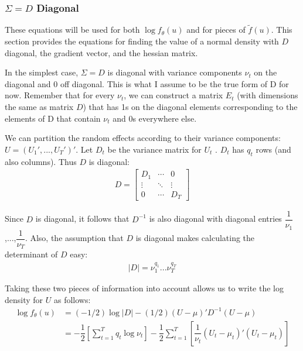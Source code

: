 \documentclass{article}
\begin{document}
\subsubsection{$\Sigma=D$ Diagonal}\label{sec:Ddiag}
These equations will be used for both $\log f_\theta(u)$ and for pieces of $\tilde{f}(u)$.  This section provides the equations for finding the value  of a normal density with $D$ diagonal, the gradient vector, and the hessian matrix.


In the simplest case, $\Sigma=D$ is diagonal with variance components $\nu_t$ on the diagonal and 0 off diagonal. This is what I assume to be the true form of D for now.  Remember that for every $\nu_t$, we can construct a matrix $E_t$ (with dimensions the same as matrix $D$) that has 1s on the diagonal elements corresponding to the elements of D that contain $\nu_t$ and 0s everywhere else.  

We can partition the random effects according to their variance components: $U=(U_1',...,U_T')'$.  Let $D_t$ be the variance matrix for $U_t$ . $D_t$ has $q_t$ rows (and also columns). Thus $D$ is diagonal:
\begin{align}
D = \begin{bmatrix} D_1 & \cdots & 0 \\ \vdots & \ddots & \vdots \\ 0 & \cdots & D_T \end{bmatrix}
\end{align}

Since $D$ is diagonal, it follows that $D^{-1}$ is also diagonal with diagonal entries $\dfrac{1}{\nu_1}$,...,$\dfrac{1}{\nu_T}$.  Also, the assumption that $D$ is diagonal makes calculating the determinant of $D$  easy:
\begin{align}
|D|= \nu_1^{q_1}...\nu_T^{q_T}
\end{align}

 Taking these two pieces of information into account allows us to write the log density for $U$ as follows:
\begin{align}
\log f_\theta(u) &= (-1/2) \log |D| - (1/2) (U-\mu)' D^{-1} (U-\mu)\\
&= -\dfrac{1}{2} \left[  \sum_{t=1}^T q_t \log \nu_t   \right]  -\dfrac{1}{2} \sum_{t=1}^T \left[ \dfrac{1}{\nu_t} (U_t-\mu_t)'(U_t-\mu_t)   \right]
\end{align}





\end{document}
